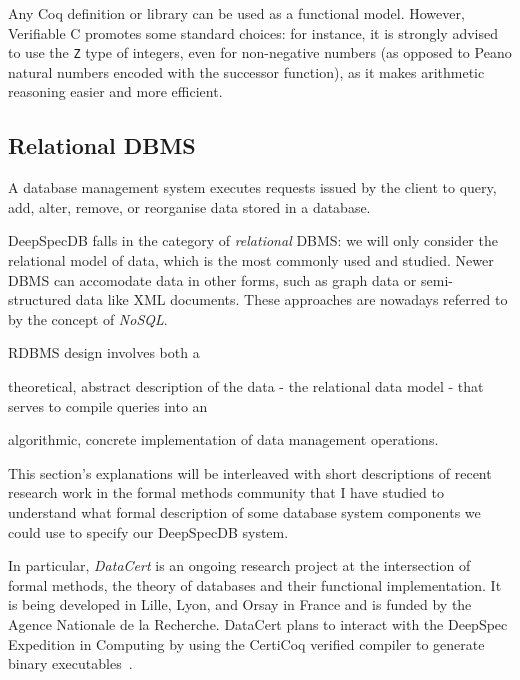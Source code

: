 \documentclass[11pt]{article}
\def\coqe{\lstinline[language=Coq, basicstyle=\small]}
\begin{document}
Any Coq definition or library can be used as a functional model.
However, Verifiable C promotes some standard choices:
for instance, it is strongly advised to use the \coqe{Z} type of integers, even for non-negative numbers (as opposed to Peano natural numbers encoded with the successor function),
as it makes arithmetic reasoning easier and more efficient.

\subsection{Relational DBMS}
\label{dbms}
A database management system executes requests issued by the client to query, add, alter, remove, or reorganise data stored in a database.

DeepSpecDB falls in the category of \emph{relational} DBMS: we will only consider the relational model of data, which is the most commonly used and studied.
Newer DBMS can accomodate data in other forms, such as graph data or semi-structured data like XML documents. These approaches are nowadays referred to by the concept of \emph{NoSQL}.

RDBMS design involves both a
\begin{enumerate*}[label=(\roman*)]\item theoretical, abstract description of the data - the relational data model - that serves to compile queries into an
\item algorithmic, concrete implementation of data management operations.\end{enumerate*}
This section's explanations will be interleaved with short descriptions of recent research work in the formal methods community that I have studied to understand
what formal description of some database system components we could use to specify our DeepSpecDB system.

In particular, \emph{DataCert} is an ongoing research project at the intersection of formal methods, the theory of databases and their functional implementation.
It is being developed in Lille, Lyon, and Orsay in France and is funded by the Agence Nationale de la Recherche.
DataCert plans to interact with the DeepSpec Expedition in Computing by using the CertiCoq verified compiler to generate binary executables~\cite{DCWSRM}.
\end{document}
